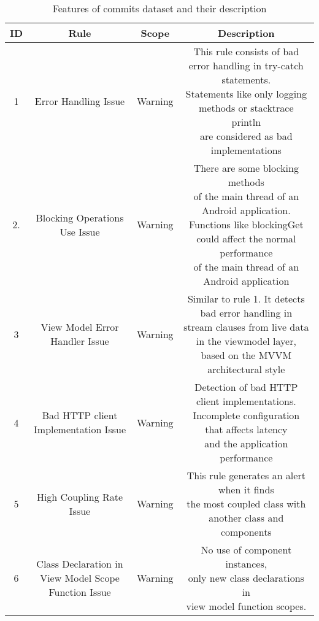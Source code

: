 \begin{table}[H]
\begin{adjustwidth}{-4cm}{-4cm}
    \centering
    \begin{tabular}{|c|c|c|c|}
        \hline
        ID & Rule & Scope & Description \\
        \hline
        1 & Error Handling Issue & Warning & \makecell{This rule consists of bad error handling in try-catch statements. \\ Statements like only logging methods or stacktrace println \\ are considered as bad implementations} \\
        \hline
        2. & Blocking Operations Use Issue & Warning & \makecell{There are some blocking methods \\ of the main thread of an Android application. \\ Functions like blockingGet could affect the normal performance \\ of  the main thread of an Android application} \\
        \hline
        3 & View Model Error Handler Issue & Warning & \makecell{Similar to rule 1. It detects bad error handling in \\ stream clauses from live data in the viewmodel layer, \\ based on the MVVM architectural style} \\
        \hline
        4 & Bad HTTP client Implementation Issue & Warning & \makecell{ Detection of bad HTTP client implementations. \\ Incomplete configuration that affects latency \\  and the application performance} \\
        \hline
        5 & High Coupling Rate Issue & Warning & \makecell{This rule generates an alert when it finds \\ the most coupled class with another class and components} \\
        \hline
        6 & \makecell{ Class Declaration in \\ View Model Scope Function Issue} & Warning & \makecell{ No use of component instances, \\ only new class declarations in \\ view model function scopes.} \\
        \hline
         \end{tabular}
    \caption{Features of commits dataset and their description}
    \label{tab:my_label}
\end{adjustwidth}
\end{table}




